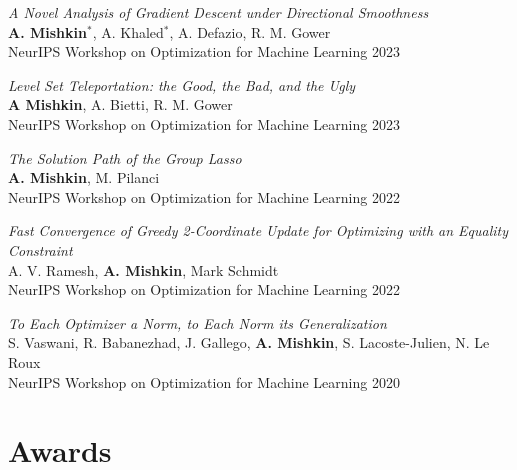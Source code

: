 \documentclass[11pt, a4paper]{article}
\makeatletter
\gdef\tshortstack{\@ifnextchar[\@tshortstack{\@tshortstack[c]}}
\gdef\@tshortstack[#1]{%
  \leavevmode
  \vtop\bgroup
    \baselineskip-\p@\lineskip 3\p@
    \let\mb@l\hss\let\mb@r\hss
    \expandafter\let\csname mb@#1\endcsname\relax
    \let\\\@stackcr
    \@ishortstack}
\newcommand{\mitem}[1]{\item[\smash{\tshortstack[l]{#1}}]}
\newcommand{\mleftsize}{4.75em}
\makeatother
\begin{document}
\begin{description}[leftmargin=\mleftsize,style=nextline,font=\normalfont\space]
    \mitem{2023\\[.25em] OptML}
    \textit{A Novel Analysis of Gradient Descent under Directional Smoothness}\\
    {\bf A. Mishkin}$^*$, A. Khaled$^*$, A. Defazio, R. M. Gower\\
    {NeurIPS Workshop on Optimization for Machine Learning} 2023

    \mitem{2023\\[.25em] OptML}
    \textit{Level Set Teleportation: the Good, the Bad, and the Ugly}\\
    \textbf{A Mishkin}, A. Bietti, R. M. Gower\\
    {NeurIPS Workshop on Optimization for Machine Learning} 2023

    \mitem{2022\\[.25em] OptML}
    {\it The Solution Path of the Group Lasso}\\
    \textbf{A. Mishkin}, M. Pilanci\\
    {NeurIPS Workshop on Optimization for Machine Learning} 2022\\
    
    \mitem{2022\\[.25em] OptML}
    {\it Fast Convergence of Greedy 2-Coordinate Update for Optimizing with an Equality Constraint}\\
    A. V. Ramesh, {\bf A. Mishkin}, Mark Schmidt\\
    {NeurIPS Workshop on Optimization for Machine Learning} 2022

    \mitem{2020\\[.25em] OptML}
    {\it To Each Optimizer a Norm, to Each Norm its Generalization}\\
    S. Vaswani, R. Babanezhad, J. Gallego, {\bf A. Mishkin}, S. Lacoste-Julien, N. Le Roux\\
    {NeurIPS Workshop on Optimization for Machine Learning} 2020
\end{description}

\section{Awards}
\end{document}

